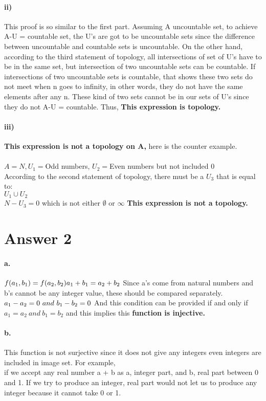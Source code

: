 \documentclass[11pt]{article}
\begin{document}
\paragraph{ii)}
This proof is so similar to the first part. Assuming A uncountable set, to achieve A-U = countable set, the U's are got to be uncountable sets since the difference between uncountable and countable sets is uncountable. On the other hand, according to the third statement of topology, all intersections of set of U's have to be in the same set, but intersection of two uncountable sets can be countable. If intersections of two uncountable sets is countable, that shows these two sets do not meet when n goes to infinity, in other words, they do not have the same elements after any n. These kind of two sets cannot be in our sets of U's since they do not A-U = countable. Thus, \textbf{This expression is topology.}
\paragraph{iii)}
\textbf{This expression is not a topology on A,} here is the counter example.\\\\
$
A = N, U_1 = $Odd numbers, $U_2 = $Even numbers but not included 0\\
According to the second statement of topology, there must be a $U_3$ that is equal to:\\ 
$U_1 \cup U_2$\\
$N - U_3 = {0}$ which is not either $\emptyset$ or $\infty$
\textbf{This expression is not a topology.}

\section*{Answer 2}
\paragraph{a.}
$
f(a_1,b_1) = f(a_2,b_2) \\
a_1 + b_1 = a_2 + b_2\\
$
Since a's come from natural numbers and b's cannot be any integer value, these should be compared separately.\\
$
a_1 - a_2 = 0 \ and\  b_1 - b_2 = 0 \\
$
And this condition can be provided if and only if $a_1 = a_2\  and\  b_1 = b_2$ and this implies this \textbf{function is injective.}
\paragraph{b.}
This function is not surjective since it does not give any integers even integers are included in image set. For example, \\
if we accept any real number a + b as a, integer part, and b, real part between 0 and 1. If we try to produce an integer,  real part would not let us to produce any integer because it cannot take 0 or 1.
\end{document}
